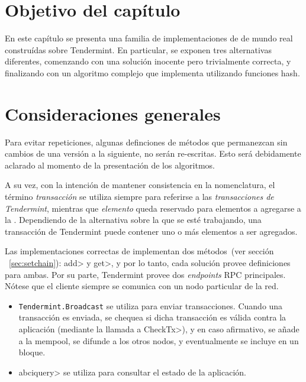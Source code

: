 \section{Objetivo del capítulo}

En este capítulo se presenta una familia de implementaciones de \setchain de mundo
real construídas sobre Tendermint.
%
En particular, se exponen tres alternativas diferentes, comenzando con una
solución inocente pero trivialmente correcta, y finalizando con un algoritmo
complejo que implementa \setchain utilizando funciones hash.
%

\section{Consideraciones generales}\label{sec:impl}
Para evitar repeticiones, algunas definciones de métodos que permanezcan sin cambios
de una versión a la siguiente, no serán re-escritas.
Esto será debidamente aclarado al momento de la presentación de los algoritmos.

%
A su vez, con la intención de mantener consistencia en la nomenclatura,
el término \textit{transacción} se utiliza siempre para referirse a las
\textit{transacciones de Tendermint}, mientras
que \textit{elemento} queda reservado para elementos a agregarse a la \setchain.
%
Dependiendo de la alternativa sobre la que se esté trabajando, una transacción de
Tendermint puede contener uno o más elementos a ser agregados.
%

Las implementaciones correctas de \setchain implementan dos métodos~(ver sección
~\ref{sec:setchain}): \<add> y \<get>, y por lo tanto, cada solución provee definiciones
para ambas.
%
Por su parte, Tendermint provee dos \textit{endpoints} RPC principales.
Nótese que el cliente siempre se comunica con un nodo particular de la red.
\begin{itemize}
  \item \texttt{Tendermint.Broadcast} se utiliza para enviar transacciones.
  Cuando una transacción es enviada, se chequea si dicha transacción
  es válida contra la aplicación (mediante la llamada a \<CheckTx>), y en caso
  afirmativo, se añade
  a la mempool, se difunde a los otros nodos, y eventualmente se incluye en
  un bloque.
  \item \<abciquery> se utiliza para consultar el estado de la
  aplicación.
\end{itemize}
%

